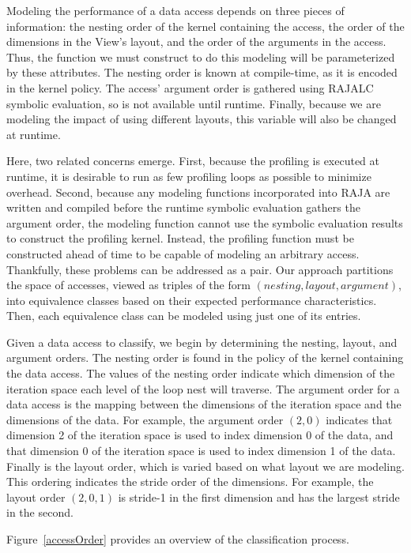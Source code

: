 Modeling the performance of a data access depends on three pieces of information: the nesting order of the kernel containing the access, the order of the dimensions in the View's layout, and the order of the arguments in the access.
Thus, the function we must construct to do this modeling will be parameterized by these attributes.
The nesting order is known at compile-time, as it is encoded in the kernel policy.
The access' argument order is gathered using RAJALC symbolic evaluation, so is not available until runtime.
Finally, because we are modeling the impact of using different layouts, this variable will also be changed at runtime.

Here, two related concerns emerge. 
First, because the profiling is executed at runtime, it is desirable to run as few profiling loops as possible to minimize overhead.
Second, because any modeling functions incorporated into RAJA are written and compiled before the runtime symbolic evaluation gathers the argument order, the modeling function cannot use the symbolic evaluation results to construct the profiling kernel. 
Instead, the profiling function must be constructed ahead of time to be capable of modeling an arbitrary access.
Thankfully, these problems can be addressed as a pair.
Our approach partitions the space of accesses, viewed as triples of the form $(nesting,layout,argument)$, into equivalence classes based on their expected performance characteristics.
Then, each equivalence class can be modeled using just one of its entries.

Given a data access to classify, we begin by determining the nesting, layout, and argument orders.
The nesting order is found in the policy of the kernel containing the data access.
The values of the nesting order indicate which dimension of the iteration space each level of the loop nest will traverse. 
The argument order for a data access is the mapping between the dimensions of the iteration space and the dimensions of the data. 
For example, the argument order $(2,0)$ indicates that dimension 2 of the iteration space is used to index dimension 0 of the data, and that dimension 0 of the iteration space is used to index dimension 1 of the data.
Finally is the layout order, which is varied based on what layout we are modeling. 
This ordering indicates the stride order of the dimensions.
For example, the layout order $(2,0,1)$ is stride-1 in the first dimension and has the largest stride in the second.

Figure~\ref{accessOrder} provides an overview of the classification process.

